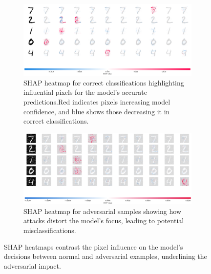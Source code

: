 \documentclass[10pt, conference, a4paper, final]{IEEEtran}
\begin{document}
\begin{figure}[h]
    \centering
    \begin{subfigure}{\columnwidth}
        \centering
        \includegraphics[width=\linewidth]{paper_images/correctshap.png}
        \caption{SHAP heatmap for correct classifications highlighting influential pixels for the model's accurate predictions.Red indicates pixels increasing model confidence, and blue shows those decreasing it in correct classifications.}
        \label{fig:correct_shap}
    \end{subfigure}
    \par\medskip %
    \begin{subfigure}{\columnwidth}
        \centering
        \includegraphics[width=\linewidth]{paper_images/adversarial.png}
        \caption{SHAP heatmap for adversarial samples showing how attacks distort the model's focus, leading to potential misclassifications.}
        \label{fig:adversarial}
    \end{subfigure}
    \caption{SHAP heatmaps contrast the pixel influence on the model's decisions between normal and adversarial examples, underlining the adversarial impact.}
    \label{fig:both_shap_figures}
\end{figure}
\end{document}

